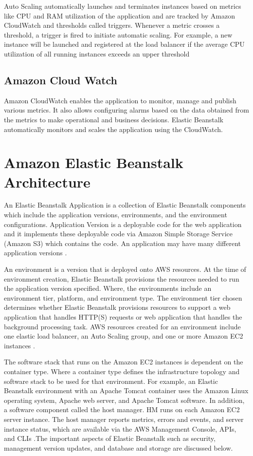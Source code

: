 \documentclass[9pt,twocolumn,twoside]{../../styles/osajnl}
\begin{document}
Auto Scaling automatically launches and terminates instances based on
metrics like CPU and RAM utilization of the application and are
tracked by Amazon CloudWatch and thresholds called triggers. Whenever
a metric crosses a threshold, a trigger is fired to initiate automatic
scaling.  For example, a new instance will be launched and registered
at the load balancer if the average CPU utilization of all running
instances exceeds an upper threshold
    
\subsection{Amazon Cloud Watch}

Amazon CloudWatch enables the application to monitor, manage and
publish various metrics. It also allows configuring alarms based on
the data obtained from the metrics to make operational and business
decisions. Elastic Beanstalk automatically monitors and scales the
application using the CloudWatch.

\section{Amazon Elastic Beanstalk Architecture}

An Elastic Beanstalk Application is a collection of Elastic Beanstalk
components which include the application versions, environments, and
the environment configurations. Application Version is a deployable
code for the web application and it implements these deployable code
via Amazon Simple Storage Service (Amazon S3) which contains the
code. An application may have many different application versions
\cite{elastic-component}.


An environment is a version that is deployed onto AWS resources.  At
the time of environment creation, Elastic Beanstalk provisions the
resources needed to run the application version specified. Where, the
environments include an environment tier, platform, and environment
type. The environment tier chosen determines whether Elastic Beanstalk
provisions resources to support a web application that handles HTTP(S)
requests or web application that handles the background processing
task. AWS resources created for an environment include one elastic
load balancer, an Auto Scaling group, and one or more Amazon EC2
instances \cite{elastic-architecture}.

The software stack that runs on the Amazon EC2 instances is dependent
on the container type. Where a container type defines the
infrastructure topology and software stack to be used for that
environment. For example, an Elastic Beanstalk environment with an
Apache Tomcat container uses the Amazon Linux operating system, Apache
web server, and Apache Tomcat software. In addition, a software
component called the host manager. HM runs on each Amazon EC2 server
instance. The host manager reports metrics, errors and events, and
server instance status, which are available via the AWS Management
Console, APIs, and CLIs \cite{elastic-architecture}.The important
aspects of Elastic Beanstalk such as security, management version
updates, and database and storage are discussed below.
\end{document}
